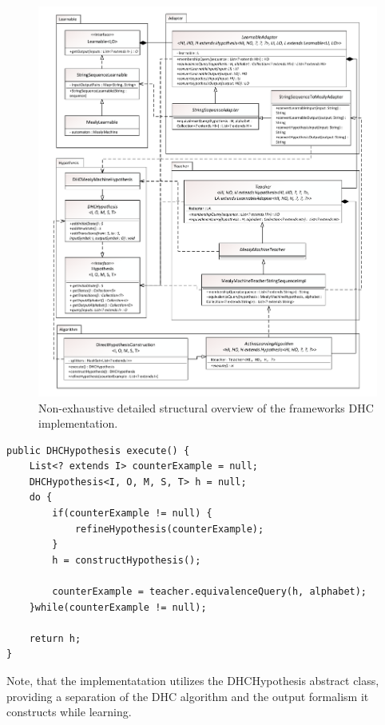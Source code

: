 \begin{itemize}
\begin{figure}[H]
		\centerline{\includegraphics[width=.90\paperwidth,height=.90\paperheight,keepaspectratio]{figures/implementationdetailedoverview}}
		\caption{Non-exhaustive detailed structural overview of the frameworks DHC implementation.}
		\label{fig:impldetailedoverview}
	\end{figure}
	
	
	
	\begin{lstlisting}[caption=The \emph{execute()} function of the DHC algorithm implementation described in Section \ref{item:stringsequencelearnable}s \emph{DirectHypothesisConstruction} item.,label=li:executedhc,float,floatplacement=H]
public DHCHypothesis execute() {
	List<? extends I> counterExample = null;
	DHCHypothesis<I, O, M, S, T> h = null;
	do {
		if(counterExample != null) {
			refineHypothesis(counterExample);
		}
		h = constructHypothesis();
		
		counterExample = teacher.equivalenceQuery(h, alphabet);
	}while(counterExample != null);
	
	return h;
}
	\end{lstlisting}
	Note, that the implementatation utilizes the DHCHypothesis abstract class, providing a separation of the DHC algorithm and the output formalism it constructs while learning.

\end{itemize}



